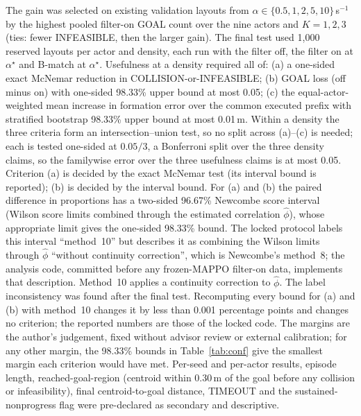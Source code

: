 \documentclass[journal]{IEEEtran}
\begin{document}
The gain was selected on existing validation layouts from $\alpha\in\{0.5,1,2,5,10\}$\,s$^{-1}$ by the
highest pooled filter-on GOAL count over the nine actors and $K=1,2,3$ (ties: fewer INFEASIBLE, then the
larger gain). The final test used 1{,}000 reserved layouts per actor and density, each run with the
filter off, the filter on at $\alpha^\star$ and B-match at $\alpha^\star$. Usefulness at a density
required all of: (a) a one-sided exact McNemar reduction in COLLISION-or-INFEASIBLE; (b) GOAL loss
(off minus on) with one-sided 98.33\% upper bound at most 0.05; (c) the equal-actor-weighted mean
increase in formation error over the common executed prefix with stratified bootstrap 98.33\% upper
bound at most 0.01\,m. Within a density the three criteria form an intersection--union test, so no
split across (a)--(c) is needed; each is tested one-sided at $0.05/3$, a Bonferroni split over the three
density claims, so the familywise error over the three usefulness claims is at most 0.05. Criterion (a)
is decided by the exact McNemar test (its interval bound is reported); (b) is decided by the interval
bound. For (a) and (b) the paired difference in proportions has a two-sided 96.67\% Newcombe score
interval \cite{newcombe1998} (Wilson score limits combined through the estimated correlation
$\hat\phi$), whose appropriate limit gives the one-sided 98.33\% bound. The locked protocol labels this
interval ``method~10'' but describes it as combining the Wilson limits through $\hat\phi$ ``without
continuity correction'', which is Newcombe's method~8; the analysis code, committed before any
frozen-MAPPO filter-on data, implements that description. Method~10 applies a continuity correction to
$\hat\phi$. The label inconsistency was found after the final test.
Recomputing every bound for (a) and (b) with method~10 changes it by less than 0.001
percentage points and changes no criterion; the
reported numbers are those of the locked code. The margins are the author's judgement, fixed
without advisor review or external calibration; for any other margin, the 98.33\% bounds in
Table~\ref{tab:conf} give the smallest margin each criterion would have met. Per-seed and per-actor results, episode length,
reached-goal-region (centroid within 0.30\,m of the goal before any collision or infeasibility),
final centroid-to-goal distance, TIMEOUT and the sustained-nonprogress flag were pre-declared as secondary and
descriptive.
\end{document}
